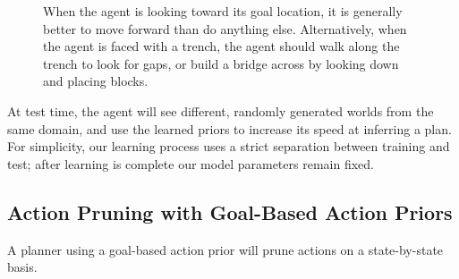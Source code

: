 \documentclass[11pt]{article}
\begin{document}
\begin{figure}
\centering
{}
\label{fig:example_affs}
\caption{When the agent is looking toward its goal location, it is generally better to move forward than do anything else. Alternatively, when the agent is faced with a trench, the agent should walk along the trench to look for gaps, or build a bridge across by looking down and placing blocks.}
\end{figure}

At test time, the agent will see different, randomly generated worlds
from the same domain, and use the learned priors to increase its
speed at inferring a plan.  For simplicity, our learning process uses
a strict separation between training and test; after learning is
complete our model parameters remain fixed.

\subsection{Action Pruning with Goal-Based Action Priors}
\label{sec:action_pruning}
A planner using a goal-based action prior will prune actions on a state-by-state basis. 
\end{document}
